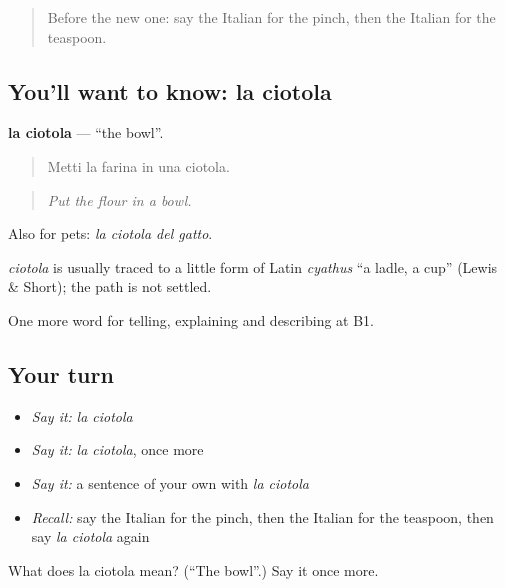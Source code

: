 \label{lesson:IT-C331-ciotola}



\begin{quote}
Before the new one: say the Italian for the pinch, then the Italian for the teaspoon.
\end{quote}

\subsection*{You'll want to know: la ciotola}
\textbf{la ciotola} — \textquotedblleft{}the bowl\textquotedblright{}.

\begin{quote}
Metti la farina in una ciotola.
\end{quote}

\begin{quote}
\emph{Put the flour in a bowl.}
\end{quote}

Also for pets: \emph{la ciotola del gatto}.

\begin{cousinweb}
\emph{ciotola} is usually traced to a little form of Latin \emph{cyathus} \textquotedblleft{}a ladle, a cup\textquotedblright{} (Lewis \& Short); the path is not settled.
\end{cousinweb}

\begin{grammarlens}[title={What you've built}]
One more word for telling, explaining and describing at B1.
\end{grammarlens}

\subsection*{Your turn}
\begin{itemize}
\raggedright
  \item \emph{Say it:} \emph{la ciotola}
  \item \emph{Say it:} \emph{la ciotola}, once more
  \item \emph{Say it:} a sentence of your own with \emph{la ciotola}
  \item \emph{Recall:} say the Italian for the pinch, then the Italian for the teaspoon, then say \emph{la ciotola} again
\end{itemize}

\begin{tcolorbox}[breakable,colback=teal!4,colframe=teal!35!black,title={Before you move on}]
What does la ciotola mean? (\textquotedblleft{}The bowl\textquotedblright{}.) Say it once more.
\end{tcolorbox}
